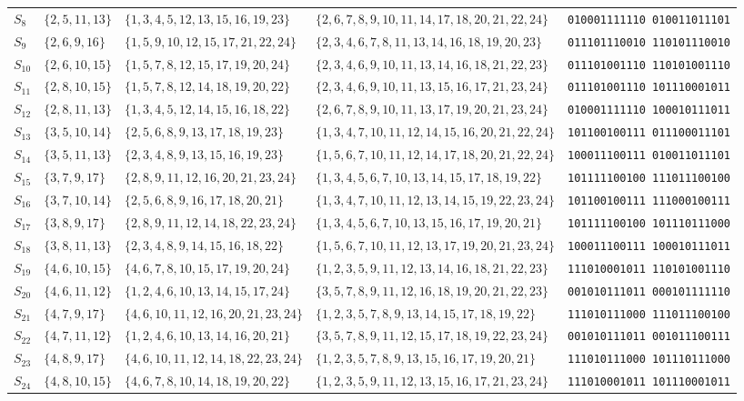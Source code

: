 \documentclass[
  aps,
  pra,
  reprint,
  superscriptaddress,
  amsmath,
  amssymb,
  nofootinbib,
  floatfix
]{revtex4-2}
\theoremstyle{definition}
\theoremstyle{remark}
\begin{document}
\begin{table}[t]
\begin{ruledtabular}
\begin{tabular}{llllc}
$S_{8}$ & $\{2,5,11,13\}$ & $\{1,3,4,5,12,13,15,16,19,23\}$ & $\{2,6,7,8,9,10,11,14,17,18,20,21,22,24\}$ & \texttt{010001111110\,010011011101} \\
$S_{9}$ & $\{2,6,9,16\}$ & $\{1,5,9,10,12,15,17,21,22,24\}$ & $\{2,3,4,6,7,8,11,13,14,16,18,19,20,23\}$ & \texttt{011101110010\,110101110010} \\
$S_{10}$ & $\{2,6,10,15\}$ & $\{1,5,7,8,12,15,17,19,20,24\}$ & $\{2,3,4,6,9,10,11,13,14,16,18,21,22,23\}$ & \texttt{011101001110\,110101001110} \\
$S_{11}$ & $\{2,8,10,15\}$ & $\{1,5,7,8,12,14,18,19,20,22\}$ & $\{2,3,4,6,9,10,11,13,15,16,17,21,23,24\}$ & \texttt{011101001110\,101110001011} \\
$S_{12}$ & $\{2,8,11,13\}$ & $\{1,3,4,5,12,14,15,16,18,22\}$ & $\{2,6,7,8,9,10,11,13,17,19,20,21,23,24\}$ & \texttt{010001111110\,100010111011} \\
$S_{13}$ & $\{3,5,10,14\}$ & $\{2,5,6,8,9,13,17,18,19,23\}$ & $\{1,3,4,7,10,11,12,14,15,16,20,21,22,24\}$ & \texttt{101100100111\,011100011101} \\
$S_{14}$ & $\{3,5,11,13\}$ & $\{2,3,4,8,9,13,15,16,19,23\}$ & $\{1,5,6,7,10,11,12,14,17,18,20,21,22,24\}$ & \texttt{100011100111\,010011011101} \\
$S_{15}$ & $\{3,7,9,17\}$ & $\{2,8,9,11,12,16,20,21,23,24\}$ & $\{1,3,4,5,6,7,10,13,14,15,17,18,19,22\}$ & \texttt{101111100100\,111011100100} \\
$S_{16}$ & $\{3,7,10,14\}$ & $\{2,5,6,8,9,16,17,18,20,21\}$ & $\{1,3,4,7,10,11,12,13,14,15,19,22,23,24\}$ & \texttt{101100100111\,111000100111} \\
$S_{17}$ & $\{3,8,9,17\}$ & $\{2,8,9,11,12,14,18,22,23,24\}$ & $\{1,3,4,5,6,7,10,13,15,16,17,19,20,21\}$ & \texttt{101111100100\,101110111000} \\
$S_{18}$ & $\{3,8,11,13\}$ & $\{2,3,4,8,9,14,15,16,18,22\}$ & $\{1,5,6,7,10,11,12,13,17,19,20,21,23,24\}$ & \texttt{100011100111\,100010111011} \\
$S_{19}$ & $\{4,6,10,15\}$ & $\{4,6,7,8,10,15,17,19,20,24\}$ & $\{1,2,3,5,9,11,12,13,14,16,18,21,22,23\}$ & \texttt{111010001011\,110101001110} \\
$S_{20}$ & $\{4,6,11,12\}$ & $\{1,2,4,6,10,13,14,15,17,24\}$ & $\{3,5,7,8,9,11,12,16,18,19,20,21,22,23\}$ & \texttt{001010111011\,000101111110} \\
$S_{21}$ & $\{4,7,9,17\}$ & $\{4,6,10,11,12,16,20,21,23,24\}$ & $\{1,2,3,5,7,8,9,13,14,15,17,18,19,22\}$ & \texttt{111010111000\,111011100100} \\
$S_{22}$ & $\{4,7,11,12\}$ & $\{1,2,4,6,10,13,14,16,20,21\}$ & $\{3,5,7,8,9,11,12,15,17,18,19,22,23,24\}$ & \texttt{001010111011\,001011100111} \\
$S_{23}$ & $\{4,8,9,17\}$ & $\{4,6,10,11,12,14,18,22,23,24\}$ & $\{1,2,3,5,7,8,9,13,15,16,17,19,20,21\}$ & \texttt{111010111000\,101110111000} \\
$S_{24}$ & $\{4,8,10,15\}$ & $\{4,6,7,8,10,14,18,19,20,22\}$ & $\{1,2,3,5,9,11,12,13,15,16,17,21,23,24\}$ & \texttt{111010001011\,101110001011}
\end{tabular}
\end{ruledtabular}
\end{table}
\end{document}
